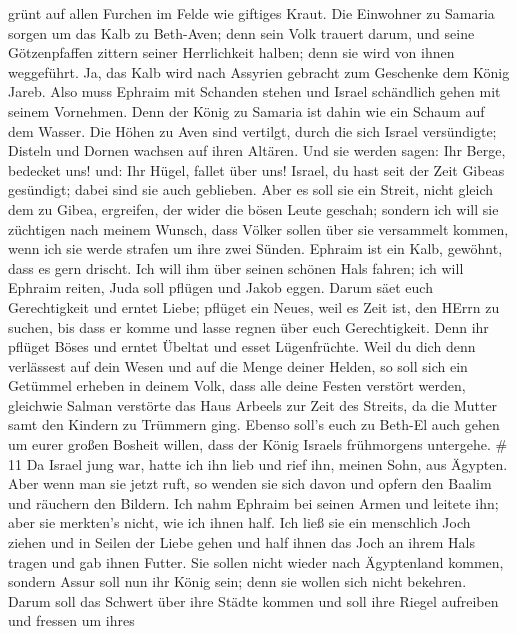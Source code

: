 grünt auf allen Furchen im Felde wie giftiges Kraut.  Die
Einwohner zu Samaria sorgen um das Kalb zu Beth-Aven; denn sein Volk
trauert darum, und seine Götzenpfaffen zittern seiner Herrlichkeit
halben; denn sie wird von ihnen weggeführt.  Ja, das Kalb
wird nach Assyrien gebracht zum Geschenke dem König Jareb. Also muss
Ephraim mit Schanden stehen und Israel schändlich gehen mit seinem
Vornehmen.  Denn der König zu Samaria ist dahin wie ein
Schaum auf dem Wasser.  Die Höhen zu Aven sind vertilgt,
durch die sich Israel versündigte; Disteln und Dornen wachsen auf ihren
Altären. Und sie werden sagen: Ihr Berge, bedecket uns! und: Ihr Hügel,
fallet über uns!  Israel, du hast seit der Zeit Gibeas
gesündigt; dabei sind sie auch geblieben. Aber es soll sie ein Streit,
nicht gleich dem zu Gibea, ergreifen, der wider die bösen Leute geschah;
 sondern ich will sie züchtigen nach meinem Wunsch, dass
Völker sollen über sie versammelt kommen, wenn ich sie werde strafen um
ihre zwei Sünden.  Ephraim ist ein Kalb, gewöhnt, dass es
gern drischt. Ich will ihm über seinen schönen Hals fahren; ich will
Ephraim reiten, Juda soll pflügen und Jakob eggen.  Darum
säet euch Gerechtigkeit und erntet Liebe; pflüget ein Neues, weil es
Zeit ist, den HErrn zu suchen, bis dass er komme und lasse regnen über
euch Gerechtigkeit.  Denn ihr pflüget Böses und erntet
Übeltat und esset Lügenfrüchte.  Weil du dich denn
verlässest auf dein Wesen und auf die Menge deiner Helden, so soll sich
ein Getümmel erheben in deinem Volk, dass alle deine Festen verstört
werden, gleichwie Salman verstörte das Haus Arbeels zur Zeit des
Streits, da die Mutter samt den Kindern zu Trümmern ging. 
Ebenso soll's euch zu Beth-El auch gehen um eurer großen Bosheit willen,
dass der König Israels frühmorgens untergehe. \# 11  Da
Israel jung war, hatte ich ihn lieb und rief ihn, meinen Sohn, aus
Ägypten.  Aber wenn man sie jetzt ruft, so wenden sie sich
davon und opfern den Baalim und räuchern den Bildern.  Ich
nahm Ephraim bei seinen Armen und leitete ihn; aber sie merkten's nicht,
wie ich ihnen half.  Ich ließ sie ein menschlich Joch ziehen
und in Seilen der Liebe gehen und half ihnen das Joch an ihrem Hals
tragen und gab ihnen Futter.  Sie sollen nicht wieder nach
Ägyptenland kommen, sondern Assur soll nun ihr König sein; denn sie
wollen sich nicht bekehren.  Darum soll das Schwert über
ihre Städte kommen und soll ihre Riegel aufreiben und fressen um ihres
